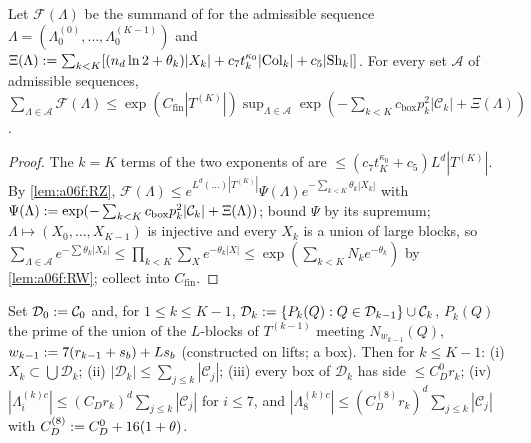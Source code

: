 \begin{proposition}\label{prop:a06f:RS}
Let $\mathcal F(\Lambda)$ be the summand of \cite[(3.42)]{Ba2} for the admissible sequence $\Lambda=(\Lambda^{(0)}_0,\dots,\Lambda^{(K-1)}_0)$ and $\Xi(\Lambda):=\sum_{k<K}[(n_d\ln2+\theta_k)|X_k|+c_7t_k^{\kappa_0}|\mathrm{Col}_k|+c_5|\mathrm{Sh}_k|]$. For every set $\mathcal A$ of admissible sequences, $\sum_{\Lambda\in\mathcal A}\mathcal F(\Lambda)\le\exp(C_{\mathrm{fin}}|T^{(K)}|)\sup_{\Lambda\in\mathcal A}\exp(-\sum_{k<K}c_{\mathrm{box}}p_k^2|\mathcal C_k|+\Xi(\Lambda))$.
\end{proposition}

\begin{proof}
The $k=K$ terms of the two exponents of \cite[(3.42)]{Ba2} are $\le(c_7t_K^{\kappa_0}+c_5)L^d|T^{(K)}|$. By \cref{lem:a06f:RZ}, $\mathcal F(\Lambda)\le e^{L^d(\dots)|T^{(K)}|}\Psi(\Lambda)e^{-\sum_{k<K}\theta_k|X_k|}$ with $\Psi(\Lambda):=\exp(-\sum_{k<K}c_{\mathrm{box}}p_k^2|\mathcal C_k|+\Xi(\Lambda))$; bound $\Psi$ by its supremum; $\Lambda\mapsto(X_0,\dots,X_{K-1})$ is injective and every $X_k$ is a union of large blocks, so $\sum_{\Lambda\in\mathcal A}e^{-\sum\theta_k|X_k|}\le\prod_{k<K}\sum_Xe^{-\theta_k|X|}\le\exp(\sum_{k<K}N_ke^{-\theta_k})$ by \cref{lem:a06f:RW}; collect into $C_{\mathrm{fin}}$.
\end{proof}

\begin{lemma}\label{lem:a06f:RD}
Set $\mathcal D_0:=\mathcal C_0$ and, for $1\le k\le K-1$, $\mathcal D_k:=\{P_k(Q):Q\in\mathcal D_{k-1}\}\cup\mathcal C_k$, $P_k(Q)$ the prime of the union of the $L$-blocks of $T^{(k-1)}$ meeting $N_{w_{k-1}}(Q)$, $w_{k-1}:=7(r_{k-1}+s_b)+Ls_b$ (constructed on lifts; a box). Then for $k\le K-1$: \textup{(i)} $X_k\subset\bigcup\mathcal D_k$; \textup{(ii)} $|\mathcal D_k|\le\sum_{j\le k}|\mathcal C_j|$; \textup{(iii)} every box of $\mathcal D_k$ has side $\le C^0_Dr_k$; \textup{(iv)} $|\Lambda^{(k)c}_i|\le(C_Dr_k)^d\sum_{j\le k}|\mathcal C_j|$ for $i\le7$, and $|\Lambda^{(k)c}_8|\le(C^{(8)}_Dr_k)^d\sum_{j\le k}|\mathcal C_j|$ with $C^{(8)}_D:= C^0_D+16(1+\theta)$.
\end{lemma}

